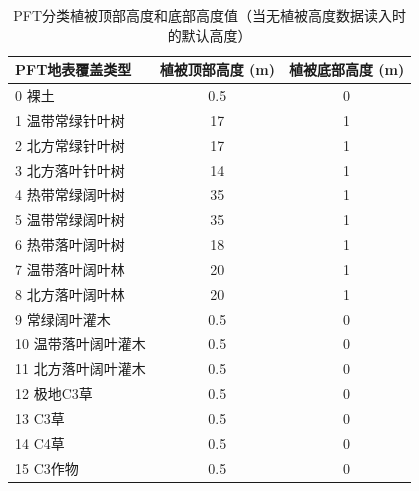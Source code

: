 \begin{table}[htbp]
    \centering
    \caption[PFT分类植被顶部高度和底部高度值]{PFT分类植被顶部高度和底部高度值（当无植被高度数据读入时的默认高度）}
    \label{tab:PFT分类植被顶部高度和底部高度值}
    \begin{tabular}{@{}lcc@{}}
    \toprule
    PFT地表覆盖类型     & 植被顶部高度 (m) & 植被底部高度 (m) \\ \midrule
    0 裸土           & 0.5          & 0          \\%
    1 温带常绿针叶树   & 17           & 1          \\
    2 北方常绿针叶树   & 17           & 1          \\
    3 北方落叶针叶树   & 14           & 1          \\
    4 热带常绿阔叶树   & 35           & 1          \\
    5 温带常绿阔叶树   & 35           & 1          \\
    6 热带落叶阔叶树   & 18           & 1          \\
    7 温带落叶阔叶林   & 20           & 1          \\
    8 北方落叶阔叶林   & 20           & 1          \\
    9 常绿阔叶灌木    & 0.5          & 0           \\
    10 温带落叶阔叶灌木 & 0.5          & 0          \\
    11 北方落叶阔叶灌木 & 0.5          & 0          \\
    12 极地C3草    & 0.5          & 0          \\
    13 C3草      & 0.5          & 0          \\
    14 C4草      & 0.5          & 0          \\
    15 C3作物     & 0.5          & 0          \\ \bottomrule

    \end{tabular}
\end{table}


